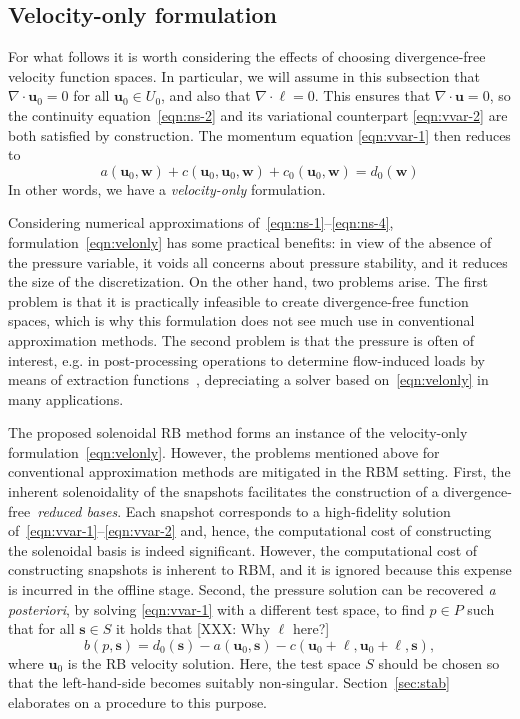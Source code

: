 \documentclass[onecolumn, twoside, a4paper, 11pt]{article}
\begin{document}
\subsection{Velocity-only formulation}

For what follows it is worth considering the effects of choosing divergence-free
velocity function spaces. In particular, we will assume in this subsection that
$\nabla \cdot \bm{u}_0 = 0$ for all $\bm{u}_0 \in U_0$, and also that
$\nabla \cdot \bm \ell = 0$. This ensures that $\nabla \cdot \bm u = 0$, so the
continuity equation~\eqref{eqn:ns-2} and its variational counterpart
\eqref{eqn:vvar-2} are both satisfied by construction. The momentum equation
\eqref{eqn:vvar-1} then reduces to
%
\begin{equation}
a(\bm u_0, \bm w) + c(\bm u_0, \bm u_0, \bm w) + c_0(\bm u_0, \bm w)
= d_0(\bm w)
\label{eqn:velonly}
\end{equation}
%
In other words, we have a \emph{velocity-only} formulation.

Considering numerical approximations of~\eqref{eqn:ns-1}--\eqref{eqn:ns-4},
formulation~\eqref{eqn:velonly} has some practical benefits: in view of the
absence of the pressure variable, it voids all concerns about
pressure stability, and it reduces the size of the discretization.
On the other hand, two problems arise. The first problem is that it is
practically infeasible to create divergence-free function spaces, which is
why this formulation does not see much use in conventional approximation methods.
The second problem is that the pressure
is often of interest, e.g. in post-processing operations to determine flow-induced loads by means
of extraction functions~\cite{Melbo2003goe,Brummelen2012fep}, depreciating a solver
based on~\eqref{eqn:velonly} in many applications.

The proposed solenoidal RB method forms an instance of the velocity-only formulation~\eqref{eqn:velonly}.
However, the problems mentioned above for conventional approximation methods are mitigated in the
RBM setting. First, the inherent solenoidality of the snapshots facilitates the construction of a
divergence-free~\emph{reduced bases}. Each snapshot corresponds to a high-fidelity solution
of~\eqref{eqn:vvar-1}--\eqref{eqn:vvar-2} and, hence, the computational cost of constructing the
solenoidal basis is indeed significant. However, the computational cost of constructing snapshots is
inherent to RBM, and it is ignored because this expense is incurred in the offline stage.  Second,
the pressure solution can be recovered \emph{a posteriori}, by solving \eqref{eqn:vvar-1} with a
different test space, to find $p\in P$ such that for all $\bm s \in S$ it holds that
[XXX: Why $\ell$ here?]
%
\begin{equation}
  b(p, \bm s) = d_0(\bm s) - a(\bm u_0, \bm s) - c(\bm u_0 + \bm \ell, \bm u_0 + \bm\ell, \bm s),
  \label{eqn:sup-vvar}
\end{equation}
where $\bm u_0$ is the RB velocity solution. Here, the test space $S$ should
be chosen so that the left-hand-side becomes suitably non-singular.
Section~\ref{sec:stab} elaborates on a procedure to this purpose.
\end{document}
